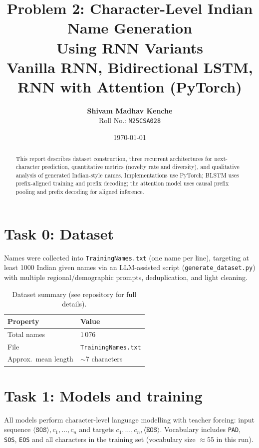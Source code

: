 \documentclass[11pt,a4paper]{article}
\title{\textbf{Problem 2: Character-Level Indian Name Generation\\
Using RNN Variants}\\[0.4em]
\large Vanilla RNN, Bidirectional LSTM, RNN with Attention (PyTorch)}
\author{%
  \textbf{Shivam Madhav Kenche}\\
  Roll No.: \texttt{M25CSA028}%
}
\date{\today}
\begin{document}
\maketitle

\begin{abstract}
This report describes dataset construction, three recurrent architectures for
next-character prediction, quantitative metrics (novelty rate and diversity), and
qualitative analysis of generated Indian-style names. Implementations use PyTorch;
BLSTM uses prefix-aligned training and prefix decoding; the attention model uses
causal prefix pooling and prefix decoding for aligned inference.
\end{abstract}

\tableofcontents
\bigskip

\section{Task 0: Dataset}
Names were collected into \texttt{TrainingNames.txt} (one name per line), targeting
at least 1000 Indian given names via an LLM-assisted script (\texttt{generate\_dataset.py})
with multiple regional/demographic prompts, deduplication, and light cleaning.

\begin{table}[h]
  \centering
  \caption{Dataset summary (see repository for full details).}
  \begin{tabular}{ll}
    \toprule
    Property & Value \\
    \midrule
    Total names & 1\,076 \\
    File & \texttt{TrainingNames.txt} \\
    Approx.\ mean length & $\sim$7 characters \\
    \bottomrule
  \end{tabular}
\end{table}

\section{Task 1: Models and training}
All models perform character-level language modelling with teacher forcing:
input sequence $\langle\texttt{SOS}\rangle, c_1,\ldots,c_n$ and targets
$c_1,\ldots,c_n,\langle\texttt{EOS}\rangle$. Vocabulary includes
\texttt{PAD}, \texttt{SOS}, \texttt{EOS} and all characters in the training set
(vocabulary size $\approx 55$ in this run).
\end{document}

